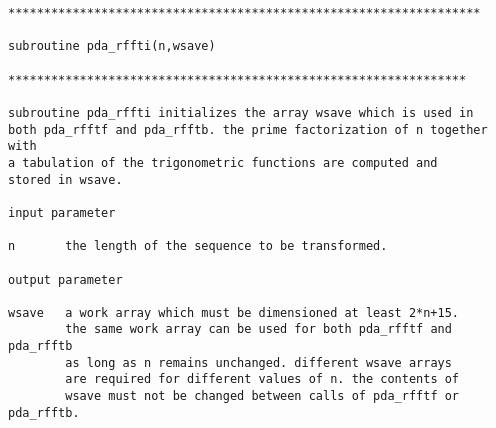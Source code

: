 

\begin{verbatim}
******************************************************************

subroutine pda_rffti(n,wsave)

****************************************************************

subroutine pda_rffti initializes the array wsave which is used in
both pda_rfftf and pda_rfftb. the prime factorization of n together with
a tabulation of the trigonometric functions are computed and
stored in wsave.

input parameter

n       the length of the sequence to be transformed.

output parameter

wsave   a work array which must be dimensioned at least 2*n+15.
        the same work array can be used for both pda_rfftf and pda_rfftb
        as long as n remains unchanged. different wsave arrays
        are required for different values of n. the contents of
        wsave must not be changed between calls of pda_rfftf or pda_rfftb.
\end{verbatim}

